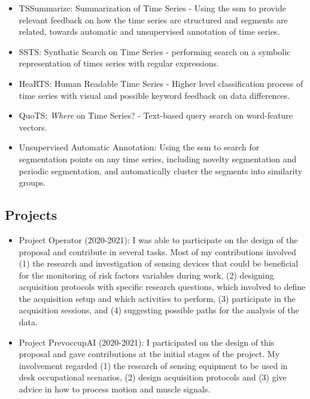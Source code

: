\begin{itemize}

\item TSSummarize: Summarization of Time Series - Using the \gls{ssm} to provide relevant feedback on how the time series are structured and segments are related, towards automatic and unsupervised annotation of time series.

\item SSTS: Synthatic Search on Time Series - performing search on a symbolic representation of times series with regular expressions.

\item HeaRTS: Human Readable Time Series - Higher level classification process of time series with visual and possible keyword feedback on data differences.

\item QuoTS: \textit{Where} on Time Series? - Text-based query search on word-feature vectors. 

\item Unsupervised Automatic Annotation: Using the \gls{ssm} to search for segmentation points on any time series, including novelty segmentation and periodic segmentation, and automatically cluster the segments into similarity groups.

\end{itemize}

\subsection{Projects}

\begin{itemize}
\item Project Operator (2020-2021): I was able to participate on the design of the proposal and contribute in several tasks. Most of my contributions involved (1) the research and investigation of sensing devices that could be beneficial for the monitoring of risk factors variables during work, (2) designing acquisition protocols with specific research questions, which involved to define the acquisition setup and which activities to perform, (3) participate in the acquisition sessions, and (4) suggesting possible paths for the analysis of the data.
\item Project PrevoccupAI (2020-2021): I participated on the design of this proposal and gave contributions at the initial stages of the project. My involvement regarded (1) the research of sensing equipment to be used in desk occupational scenarios, (2) design acquisition protocols and (3) give advice in how to process motion and muscle signals.
\end{itemize}

